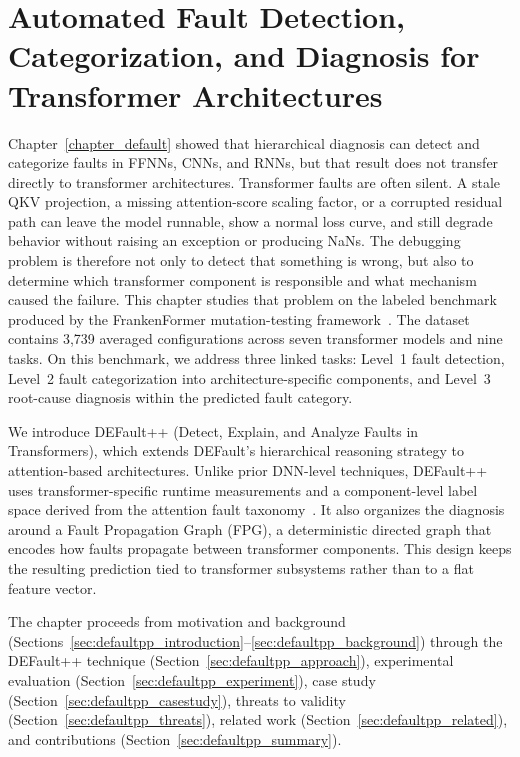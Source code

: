 \chapter{Automated Fault Detection, Categorization, and Diagnosis for Transformer Architectures}
\label{chapter_defaultpp}

Chapter~\ref{chapter_default} showed that hierarchical diagnosis can detect and categorize faults in FFNNs, CNNs, and RNNs, but that result does not transfer directly to transformer architectures. Transformer faults are often silent. A stale QKV projection, a missing attention-score scaling factor, or a corrupted residual path can leave the model runnable, show a normal loss curve, and still degrade behavior without raising an exception or producing NaNs. The debugging problem is therefore not only to detect that something is wrong, but also to determine which transformer component is responsible and what mechanism caused the failure. This chapter studies that problem on the labeled benchmark produced by the FrankenFormer mutation-testing framework~\cite{frankenformer}. The dataset contains 3{,}739 averaged configurations across seven transformer models and nine tasks. On this benchmark, we address three linked tasks: Level~1 fault detection, Level~2 fault categorization into architecture-specific components, and Level~3 root-cause diagnosis within the predicted fault category.

We introduce DEFault++ (Detect, Explain, and Analyze Faults in Transformers), which extends DEFault's hierarchical reasoning strategy to attention-based architectures. Unlike prior DNN-level techniques, DEFault++ uses transformer-specific runtime measurements and a component-level label space derived from the attention fault taxonomy~\cite{attention_taxonomy}. It also organizes the diagnosis around a Fault Propagation Graph (FPG), a deterministic directed graph that encodes how faults propagate between transformer components. This design keeps the resulting prediction tied to transformer subsystems rather than to a flat feature vector.

The chapter proceeds from motivation and background (Sections~\ref{sec:defaultpp_introduction}--\ref{sec:defaultpp_background}) through the DEFault++ technique (Section~\ref{sec:defaultpp_approach}), experimental evaluation (Section~\ref{sec:defaultpp_experiment}), case study (Section~\ref{sec:defaultpp_casestudy}), threats to validity (Section~\ref{sec:defaultpp_threats}), related work (Section~\ref{sec:defaultpp_related}), and contributions (Section~\ref{sec:defaultpp_summary}).

